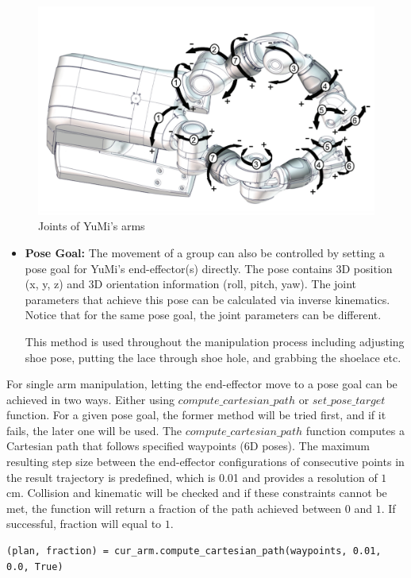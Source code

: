 \begin{figure}[H]
\centering
\includegraphics[width = 0.7\columnwidth]{Implementation/mp/yumijoints.png}
\caption{Joints of YuMi's arms \citep{Productspecification}}
\label{yumijoint}
\end{figure}

\begin{itemize}
    \item \textbf{Pose Goal:} The movement of a group can also be controlled by setting a pose goal for YuMi's end-effector(s) directly. The pose contains 3D position (x, y, z) and 3D orientation information (roll, pitch, yaw). The joint parameters that achieve this pose can be calculated via inverse kinematics. Notice that for the same pose goal, the joint parameters can be different.
    
    This method is used throughout the manipulation process including adjusting shoe pose, putting the lace through shoe hole, and grabbing the shoelace etc.
\end{itemize}

For single arm manipulation, letting the end-effector move to a pose goal can be achieved in two ways. Either using $compute\_cartesian\_path$ or $set\_pose\_target$ function. For a given pose goal, the former method will be tried first, and if it fails, the later one will be used. The $compute\_cartesian\_path$ function computes a Cartesian path that follows specified waypoints (6D poses). The maximum resulting step size between the end-effector configurations of consecutive points in the result trajectory is predefined, which is 0.01 and provides a resolution of $1$ cm. Collision and kinematic will be checked and if these constraints cannot be met, the function will return a fraction of the path achieved between $0$ and $1$. If successful, fraction will equal to $1$.

\begin{verbatim}
(plan, fraction) = cur_arm.compute_cartesian_path(waypoints, 0.01, 0.0, True)
\end{verbatim}

